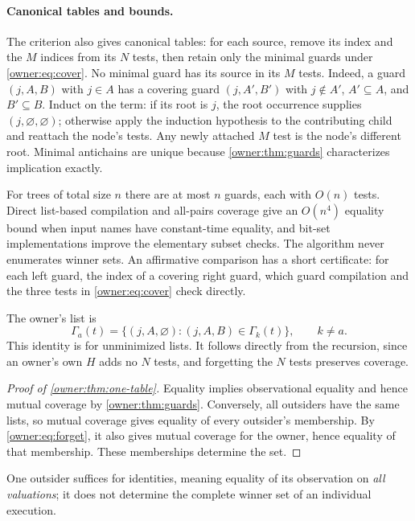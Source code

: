 \paragraph{Canonical tables and bounds.}
The criterion also gives canonical tables: for each source, remove its index and the $M$ indices from its $N$ tests, then retain only the minimal guards under \eqref{owner:eq:cover}. No minimal guard has its source in its $M$ tests. Indeed, a guard $(j,A,B)$ with $j\in A$ has a covering guard $(j,A',B')$ with $j\notin A'$,
$A'\subseteq A$, and $B'\subseteq B$. Induct on the term: if its root is $j$, the root occurrence supplies $(j,\varnothing,\varnothing)$; otherwise apply the induction hypothesis to the contributing child and reattach the node's tests. Any newly attached $M$ test is the node's different root. Minimal antichains are unique
because \cref{owner:thm:guards} characterizes implication exactly.

For trees of total size $n$ there are at most $n$ guards, each with $O(n)$ tests. Direct list-based compilation and all-pairs coverage give an $O(n^4)$ equality bound when input names have constant-time equality, and bit-set implementations improve the elementary subset checks. The algorithm never enumerates winner sets. An
affirmative comparison has a short certificate: for each left guard, the index of a covering right guard, which guard compilation and the three tests in \eqref{owner:eq:cover} check directly.

The owner's list is
\begin{equation}\label{owner:eq:forget}
 \Gamma_a(t)=\{(j,A,\varnothing):(j,A,B)\in\Gamma_k(t)\},
 \qquad k\ne a.
\end{equation}
This identity is for unminimized lists. It follows directly from the recursion, since an owner's own $H$ adds no $N$ tests, and forgetting the $N$ tests preserves coverage.

\begin{proof}[Proof of \cref{owner:thm:one-table}]
Equality implies observational equality and hence mutual coverage by
\cref{owner:thm:guards}. Conversely, all outsiders have the same lists,
so mutual coverage gives equality of every outsider's membership.
By \eqref{owner:eq:forget}, it also gives mutual coverage for the owner,
hence equality of that membership. These memberships determine the set.
\end{proof}

One outsider suffices for identities, meaning equality of its observation on \emph{all valuations}; it does not determine the
complete winner set of an individual execution.


